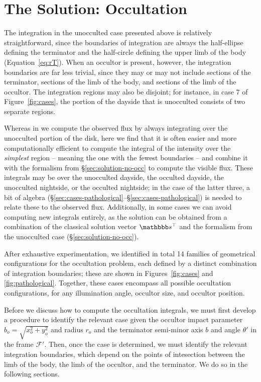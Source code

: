 \documentclass[modern]{aastex62}
\begin{document}
\section{The Solution: Occultation}
\label{sec:solution-occ}
%
The integration in the unocculted case presented above is relatively
straightforward, since
the boundaries of integration are always the half-ellipse defining the
terminator and the half-circle defining the upper limb of the body
(Equation~\ref{eq:rT}). When an occultor is present, however, the
integration boundaries are far less trivial, since they may or may not
include sections of the terminator, sections of the limb of the body,
and sections of the limb of the occultor. The integration regions may also
be disjoint; for instance, in case 7 of Figure~\ref{fig:cases}, the
portion of the dayside that is unocculted consists of two separate
regions.

Whereas in \citet{Luger2019} we compute the observed flux by always
integrating over the unocculted portion of the disk, here we find that
it is often easier and more computationally efficient to compute the
integral of the intensity over the
\emph{simplest} region -- meaning the one with the fewest boundaries --
and combine it with the formalism from \S\ref{sec:solution-no-occ} to
compute the visible flux. These integrals may be over the unocculted dayside,
the occulted dayside, the unocculted nightside, or the occulted nightside;
in the case of the latter three, a bit of algebra
(\S\ref{sec:cases-pathological}--\S\ref{sec:cases-pathological}) is needed
to relate these to the observed flux. Additionally, in some cases we can
avoid computing new integrals entirely, as the solution can be obtained from
a combination of the classical \starry solution vector $\sT$ and the
formalism from the unocculted case (\S\ref{sec:solution-no-occ}).

After exhaustive experimentation, we identified in total 14 families of
geometrical configurations for the occultation problem,
each defined by a distinct combination of integration
boundaries; these are shown in Figures~\ref{fig:cases} and
\ref{fig:pathological}.
Together, these cases encompass all possible
occultation configurations, for any illumination angle, occultor size, and
occultor position.

Before we discuss how to compute the occultation integrals, we must first
develop a procedure to identify the relevant case given the occultor
impact parameter $b_o = \sqrt{x_o^2 + y_o^2}$ and radius $r_o$ and
the terminator semi-minor
axis $b$ and angle $\theta'$ in the frame $\mathcal{F}'$.
Then, once the case is determined, we must
identify the relevant integration boundaries, which depend on the points
of intesection between the limb of the body, the limb of the occultor, and
the terminator. We do so in the following sections.
\end{document}
